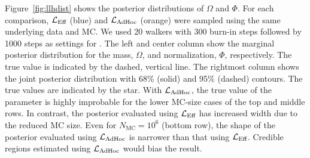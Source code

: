 Figure~\ref{fig:llhdist} shows the posterior distributions of $\Omega$ and $\Phi$.
For each comparison, $\mathcal{L}_\textmd{Eff}$ (blue) and $\mathcal{L}_{\textmd{AdHoc}}$ (orange) were sampled using the same underlying data and MC.
We used 20 walkers with 300 burn-in steps followed by 1000 steps as settings for \emcee.
The left and center column show the marginal posterior distribution for the mass, $\Omega$, and normalization, $\Phi$, respectively.
The true value is indicated by the dashed, vertical line.
The rightmost column shows the joint posterior distribution with 68\% (solid) and 95\% (dashed) contours.
The true values are indicated by the star.
With $\mathcal{L}_{\textmd{AdHoc}}$, the true value of the parameter is highly improbable for the lower MC-size cases of the top and middle rows.
In contrast, the posterior evaluated using $\mathcal{L}_\textmd{Eff}$ has increased width due to the reduced MC size.
Even for $N_\mathrm{MC}=10^6$ (bottom row), the shape of the posterior evaluated using $\mathcal{L}_{\textmd{AdHoc}}$ is narrower than that using $\mathcal{L}_\textmd{Eff}$.
Credible regions estimated using $\mathcal{L}_{\textmd{AdHoc}}$ would bias the result.

